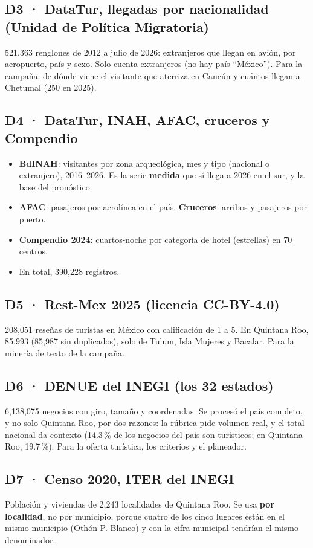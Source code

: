 \subsection*{D3 · DataTur, llegadas por nacionalidad (Unidad de Política Migratoria)}
521,363 renglones de 2012 a julio de 2026: extranjeros que llegan en avión, por aeropuerto, país y sexo. Solo cuenta
extranjeros (no hay país ``México''). Para la campaña: de dónde viene el visitante que aterriza en Cancún y cuántos
llegan a Chetumal (250 en 2025).

\subsection*{D4 · DataTur, INAH, AFAC, cruceros y Compendio}
\begin{itemize}
\item \textbf{BdINAH}: visitantes por zona arqueológica, mes y tipo (nacional o extranjero), 2016–2026. Es la serie
  \textbf{medida} que sí llega a 2026 en el sur, y la base del pronóstico.
\item \textbf{AFAC}: pasajeros por aerolínea en el país. \textbf{Cruceros}: arribos y pasajeros por puerto.
\item \textbf{Compendio 2024}: cuartos-noche por categoría de hotel (estrellas) en 70 centros.
\item En total, 390,228 registros.
\end{itemize}

\subsection*{D5 · Rest-Mex 2025 (licencia CC-BY-4.0)}
208,051 reseñas de turistas en México con calificación de 1 a 5. En Quintana Roo, 85,993 (85,987 sin duplicados), solo
de Tulum, Isla Mujeres y Bacalar. Para la minería de texto de la campaña.

\subsection*{D6 · DENUE del INEGI (los 32 estados)}
6,138,075 negocios con giro, tamaño y coordenadas. Se procesó el país completo, y no solo Quintana Roo, por dos razones:
la rúbrica pide volumen real, y el total nacional da contexto (14.3\,\% de los negocios del país son turísticos; en
Quintana Roo, 19.7\,\%). Para la oferta turística, los criterios y el planeador.

\subsection*{D7 · Censo 2020, ITER del INEGI}
Población y viviendas de 2,243 localidades de Quintana Roo. Se usa \textbf{por localidad}, no por municipio, porque
cuatro de los cinco lugares están en el mismo municipio (Othón P. Blanco) y con la cifra municipal tendrían el mismo
denominador.

